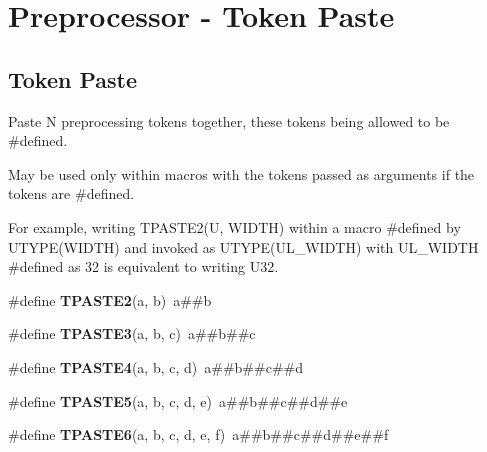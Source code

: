 \hypertarget{group__group__sam0__utils__tpaste}{}\section{Preprocessor -\/ Token Paste}
\label{group__group__sam0__utils__tpaste}
\subsection*{Token Paste}
\label{_amgrp95fd98b9acf33b4f1f1cfa86699bc1f2}%
Paste N preprocessing tokens together, these tokens being allowed to be \#defined.

May be used only within macros with the tokens passed as arguments if the tokens are \#defined.

For example, writing T\+P\+A\+S\+T\+E2(\+U, W\+I\+D\+T\+H) within a macro \#defined by U\+T\+Y\+P\+E(\+W\+I\+D\+T\+H) and invoked as U\+T\+Y\+P\+E(\+U\+L\+\_\+\+W\+I\+D\+T\+H) with U\+L\+\_\+\+W\+I\+D\+T\+H \#defined as 32 is equivalent to writing U32. \begin{DoxyCompactItemize}
\item 
\hypertarget{group__group__sam0__utils__tpaste_ga55fb148844f5ba993a992b609728e82e}{}\#define {\bfseries T\+P\+A\+S\+T\+E2}(a,  b)~a\#\#b\label{group__group__sam0__utils__tpaste_ga55fb148844f5ba993a992b609728e82e}

\item 
\hypertarget{group__group__sam0__utils__tpaste_ga3774e5e321825e6ab4a27fef2a0deb14}{}\#define {\bfseries T\+P\+A\+S\+T\+E3}(a,  b,  c)~a\#\#b\#\#c\label{group__group__sam0__utils__tpaste_ga3774e5e321825e6ab4a27fef2a0deb14}

\item 
\hypertarget{group__group__sam0__utils__tpaste_ga7df52ac8ee04480944ef404ef9418b38}{}\#define {\bfseries T\+P\+A\+S\+T\+E4}(a,  b,  c,  d)~a\#\#b\#\#c\#\#d\label{group__group__sam0__utils__tpaste_ga7df52ac8ee04480944ef404ef9418b38}

\item 
\hypertarget{group__group__sam0__utils__tpaste_gac9624b958617cbb3281de7ec41f53230}{}\#define {\bfseries T\+P\+A\+S\+T\+E5}(a,  b,  c,  d,  e)~a\#\#b\#\#c\#\#d\#\#e\label{group__group__sam0__utils__tpaste_gac9624b958617cbb3281de7ec41f53230}

\item 
\hypertarget{group__group__sam0__utils__tpaste_ga2c4dbcf9049d7553366bbf9b9bc4e801}{}\#define {\bfseries T\+P\+A\+S\+T\+E6}(a,  b,  c,  d,  e,  f)~a\#\#b\#\#c\#\#d\#\#e\#\#f\label{group__group__sam0__utils__tpaste_ga2c4dbcf9049d7553366bbf9b9bc4e801}


\end{DoxyCompactItemize}
